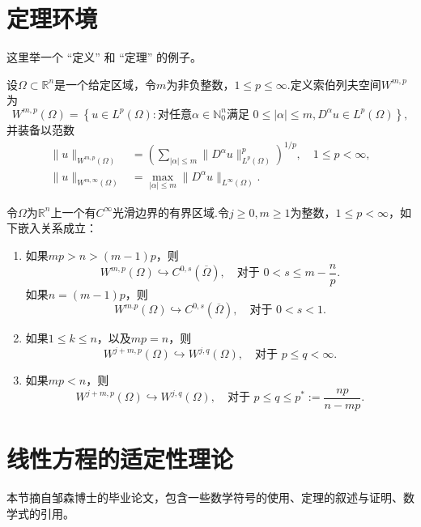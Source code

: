 \section{定理环境}

这里举一个 ``定义'' 和 ``定理'' 的例子。

\begin{definition}
设$\Omega\subset\mathbb{R}^n$是一个给定区域，令$m$为非负整数，$1\leq p\leq \infty$.定义索伯列夫空间$W^{m,p}$为
$$
W^{m,p}(\Omega)=\left\{u\in L^p(\Omega): \text{对任意}\alpha\in \mathbb{N}_{0}^n\text{满足 }0\leq |\alpha|\leq m, D^{\alpha}u\in L^p(\Omega) \right\},
$$
并装备以范数
\begin{equation*}
\begin{aligned}
\|u\|_{W^{m,p}(\Omega)} &= \left( \sum_{|\alpha|\leq m} \|D^{\alpha}u\|_{L^p(\Omega)}^p \right)^{1/p},\quad 1\leq p <\infty, \label{eq:sobolev-norm}\\
\|u\|_{W^{m,\infty}(\Omega)} &= \max_{|\alpha|\leq m} \|D^{\alpha}u\|_{L^{\infty}(\Omega)}.
\end{aligned}
\end{equation*}
\end{definition}


\begin{theorem}\label{thm:sobolev-embedding}
令$\Omega$为$\mathbb{R}^n$上一个有$C^{\infty}$光滑边界的有界区域.令$j\geq 0,m\geq 1$为整数，$1\leq p<\infty$，如下嵌入关系成立：
\begin{enumerate}
\item 如果$mp>n>(m-1)p$，则
$$
W^{m,p}(\Omega) \hookrightarrow C^{0,s}(\overline{\Omega}), \quad \text{对于 }0<s\leq m-\frac{n}{p}.
$$
如果$n=(m-1)p$，则
$$
W^{m.p}(\Omega) \hookrightarrow C^{0,s}(\overline{\Omega}), \quad \text{对于 }0<s<1.
$$
\item 如果$1\leq k\leq n$，以及$mp=n$，则
$$
W^{j+m,p}(\Omega)\hookrightarrow W^{j,q}(\Omega), \quad \text{对于 }p\leq q < \infty.
$$
\item 如果$mp<n$，则
$$
W^{j+m,p}(\Omega) \hookrightarrow W^{j,q}(\Omega), \quad \text{对于 }p\leq q \leq p^{*}:=\frac{np}{n-mp}.
$$
\end{enumerate}
\end{theorem}



\section{线性方程的适定性理论}\label{sec:linear-wellposedness}
本节摘自邹森博士的毕业论文，包含一些数学符号的使用、定理的叙述与证明、数学式的引用。

